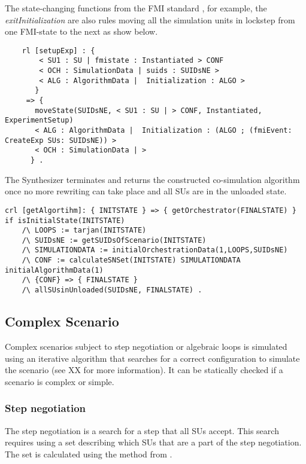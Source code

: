 The state-changing functions from the FMI standard \cite{FMI2014}, for example, the \textit{exitInitialization} are also rules moving all the simulation units in lockstep from one FMI-state to the next as show below.
\begin{lstlisting}
    rl [setupExp] : { 
        < SU1 : SU | fmistate : Instantiated > CONF
        < OCH : SimulationData | suids : SUIDsNE > 
        < ALG : AlgorithmData |  Initialization : ALGO > 
       }
     => { 
       moveState(SUIDsNE, < SU1 : SU | > CONF, Instantiated, ExperimentSetup)
       < ALG : AlgorithmData |  Initialization : (ALGO ; (fmiEvent: CreateExp SUs: SUIDsNE)) > 
       < OCH : SimulationData | > 
      } .
\end{lstlisting}

The Synthesizer terminates and returns the constructed co-simulation algorithm once no more rewriting can take place and all SUs are in the unloaded state.

\begin{lstlisting}
crl [getAlgortihm]: { INITSTATE } => { getOrchestrator(FINALSTATE) }
if isInitialState(INITSTATE)
    /\ LOOPS := tarjan(INITSTATE)
    /\ SUIDsNE := getSUIDsOfScenario(INITSTATE)
    /\ SIMULATIONDATA := initialOrchestrationData(1,LOOPS,SUIDsNE)
    /\ CONF := calculateSNSet(INITSTATE) SIMULATIONDATA initialAlgorithmData(1)
    /\ {CONF} => { FINALSTATE } 
    /\ allSUsinUnloaded(SUIDsNE, FINALSTATE) .
\end{lstlisting}

\subsection{Complex Scenario}
Complex scenarios subject to step negotiation or algebraic loops is simulated using an iterative algorithm that searches for a correct configuration to simulate the scenario (see XX for more information).
It can be statically checked if a scenario is complex or simple.

\subsubsection{Step negotiation}
The step negotiation is a search for a step that all SUs accept.
This search requires using a set describing which SUs that are a part of the step negotiation.
The set is calculated using the method from \cite{thrane2021}.


